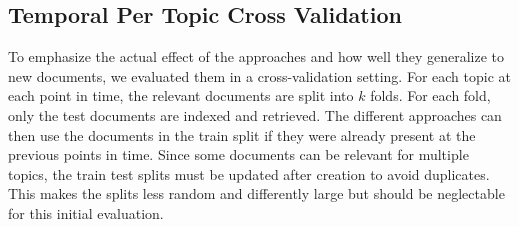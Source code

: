 

\subsection{Temporal Per Topic Cross Validation}
To emphasize the actual effect of the approaches and how well they generalize to new documents, we evaluated them in a cross-validation setting. For each topic at each point in time, the relevant documents are split into $k$ folds. For each fold, only the test documents are indexed and retrieved. The different approaches can then use the documents in the train split if they were already present at the previous points in time. Since some documents can be relevant for multiple topics, the train test splits must be updated after creation to avoid duplicates. This makes the splits less random and differently large but should be neglectable for this initial evaluation.


